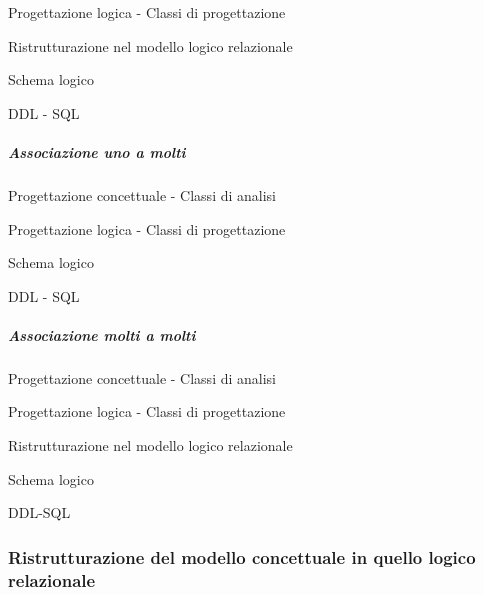 \documentclass[italian,a4paper]{article}
\begin{document}
Progettazione logica - Classi di progettazione



Ristrutturazione nel modello logico relazionale



Schema logico


DDL - SQL


\subparagraph{Associazione uno a molti}\label{associazione-uno-a-molti}

Progettazione concettuale - Classi di analisi



Progettazione logica - Classi di progettazione



Schema logico

DDL - SQL

\subparagraph{Associazione molti a
molti}\label{associazione-molti-a-molti}

Progettazione concettuale - Classi di analisi



Progettazione logica - Classi di progettazione



Ristrutturazione nel modello logico relazionale



Schema logico

DDL-SQL

\subsubsection{Ristrutturazione del modello concettuale in quello logico
relazionale}\label{ristrutturazione-del-modello-concettuale-in-quello-logico-relazionale}
\end{document}
